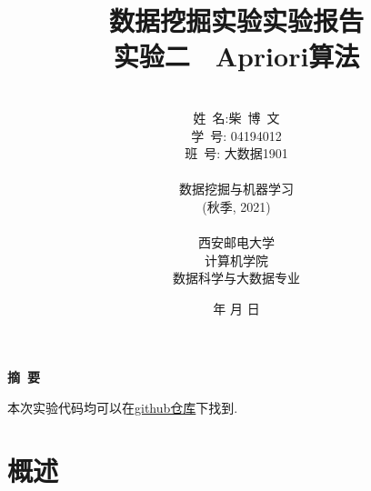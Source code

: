 \documentclass[a4paper]{article}
\begin{document}
\renewcommand{\contentsname}{目\ 录}
\renewcommand{\appendixname}{附录}
\renewcommand{\appendixpagename}{附录}
\renewcommand{\refname}{参考文献}
\renewcommand{\figurename}{图}
\renewcommand{\tablename}{表}
\renewcommand{\today}{\number\year 年 \number\month 月 \number\day 日}

\title{{\Huge 数据挖掘实验实验报告{\large\linebreak\\}}{\Large 实验二　Apriori算法\linebreak\linebreak}}
\author{\\姓\ 名:柴\ 博\ 文\\
    学\ 号: 04194012\\
    班\ 号: 大数据1901\\\\
    数据挖掘与机器学习\\
    (秋季, 2021)\\\\
    西安邮电大学\\
    计算机学院\\
    数据科学与大数据专业}
\date{\today}
\maketitle
\newpage

\begin{center}
    {\Large\bf{摘\ 要\\}}
\end{center}

本次实验代码均可以在\href{https://github.com/lovebaihezi/lab/tree/main/data-process/apriori}{github仓库}下找到.

\newpage
\begin{center}
    \tableofcontents\label{c}
\end{center}
\newpage



\section{概述} \label{overview}%
\end{document}
